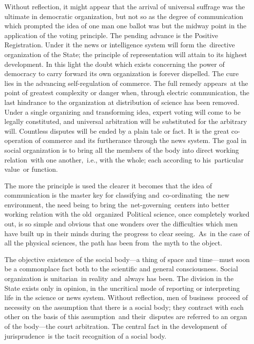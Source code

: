 \documentclass[twoside,symmetric,nobib,justified]{tufte-book}
\begin{document}
Without reflection, it might appear that the arrival of universal
suffrage was the ultimate in democratic organization, but not so as the
degree of communication which prompted the idea of one man one ballot
was but the midway point in the application of the voting principle. The
pending advance is the Positive Registration. Under it the news or
intelligence system will form the~directive organization of the State;
the principle of representation will attain to its highest development.
In this light the doubt which exists concerning the power of democracy
to carry forward its own organization is forever dispelled. The cure
lies in the advancing self-regulation of commerce. The full remedy
appears~at the point of greatest complexity or danger when, through
electric communication, the last hindrance to the organization at
distribution of science has been removed. Under a single organizing and
transforming idea, expert voting will come to be legally constituted,
and universal arbitration will be substituted for the arbitrary will.
Countless disputes will be ended by a plain tale or fact. It is the
great co-operation of commerce and its furtherance through the news
system. The goal in social organization is to bring all the members of
the body into direct working relation~with one another,~i.e., with the
whole; each according to his~particular value~or function.~

The more the principle is used the clearer it becomes that the idea of
communication is the master key for classifying and~co-ordinating~the
new environment, the need being to bring the~net-governing~centers into
better working relation with the old~organized~Political science, once
completely worked out, is so simple and obvious that one wonders over
the difficulties which men have built up in their minds during the
progress to clear seeing.~As~in the case of all the physical sciences,
the path has been from~the myth to the object.~~

The objective existence of the social body---a thing of space and
time---must soon be a commonplace fact both to the scientific and
general consciousness. Social organization is unitarian~in reality
and~always has been. The division in the State exists only in opinion,
in the uncritical mode of reporting or interpreting life in the science
or news system. Without reflection, men of business~proceed of necessity
on the assumption that there is a social body; they contract with each
other on the basis of this assumption~and their~disputes are referred to
an organ of the body---the court arbitration. The central fact in the
development of jurisprudence~is the tacit recognition of a social body.
~
\end{document}
